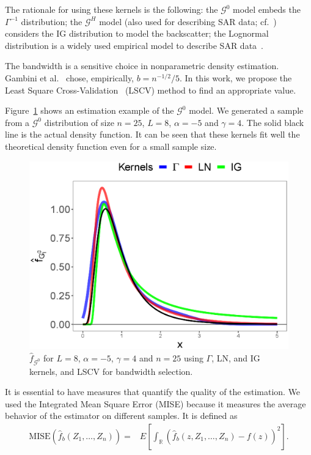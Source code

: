 \documentclass[twocolumn]{svjour3}
\begin{document}
	The rationale for using these kernels is the following:
	the $\mathcal{G}^0$ model embeds the $\Gamma^{-1}$ distribution;
	the $\mathcal{G}^H$ model (also used for describing SAR data; cf.~\cite{PolarimetricSegmentationBSplinesMSSP}) considers the IG distribution to model the backscatter;
	the Lognormal distribution is a widely used empirical model to describe SAR data~\cite{Gao2010}. 
	
	The bandwidth is a sensitive choice in nonparametric density estimation. 
	Gambini et al.~\cite{gambini2015} chose, empirically, $b=n^{-1/2}/5$. 
	In this work, we propose the Least Square Cross-Validation~\cite{Wu1997} (LSCV) method to find an appropriate value.
	
	Figure~\ref{EstimacionLNyGAyIG} shows an estimation example of the $\mathcal{G}^0$ model. 
	We generated a sample from a $\mathcal{G}^0$ distribution of size $n=25$, $L = 8$, $\alpha=-5$ and $\gamma=4$. 
	The solid black line is the actual density function. 
	It can be seen that these kernels fit well the theoretical density function even for a small sample size.
	
	\begin{figure}[hbt]
		\centering
		\includegraphics[scale=0.35]{../../../Figures/PaperTesis/NucleosGALNyIG.eps}
		\caption{$\widehat{f}_{\mathcal{G}^0}$ for $L=8$, $\alpha=-5$, $\gamma=4$ and $n=25$ using $\Gamma$, LN, and IG kernels, and LSCV for bandwidth selection.}\label{EstimacionLNyGAyIG}
	\end{figure}
	
	It is essential to have measures that quantify the quality of the estimation. 
	We used the Integrated Mean Square Error (MISE) because it measures the average behavior of the estimator on different samples. 
	It is defined as
	\begin{align}
	\label{Mise}
	\text{MISE}(\widehat{f}_b(Z_1,\ldots,Z_n))=&E\left[\int_\mathbb{R} (\widehat{f}_b(z,Z_1,\ldots,Z_n)-f(z))^2 \right].
	\end{align}
	
\end{document}
